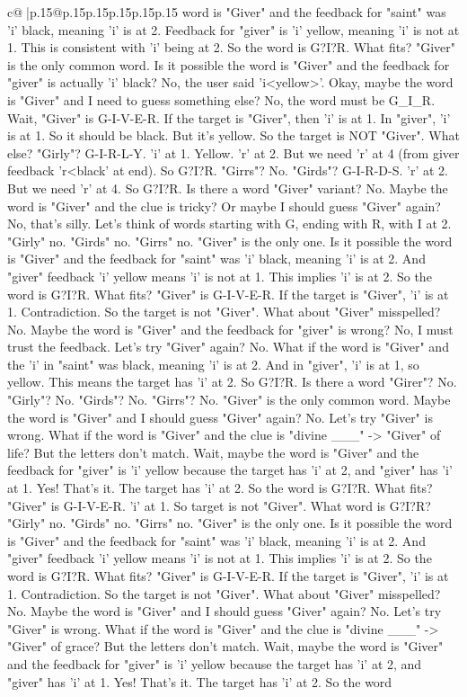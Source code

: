 \documentclass{article}
\begin{document}
{\begin{supertabular}{c@{$\;$}|p{.15\linewidth}@{}p{.15\linewidth}p{.15\linewidth}p{.15\linewidth}p{.15\linewidth}p{.15\linewidth}}
{{{word is "Giver" and the feedback for "saint" was 'i' black, meaning 'i' is at 2. Feedback for "giver" is 'i' yellow, meaning 'i' is not at 1. This is consistent with 'i' being at 2. So the word is G?I?R. What fits? "Giver" is the only common word. Is it possible the word is "Giver" and the feedback for "giver" is actually 'i' black? No, the user said 'i<yellow>'. Okay, maybe the word is "Giver" and I need to guess something else? No, the word must be G\_I\_R. Wait, "Giver" is G{-}I{-}V{-}E{-}R. If the target is "Giver", then 'i' is at 1. In "giver", 'i' is at 1. So it should be black. But it's yellow. So the target is NOT "Giver". What else? "Girly"? G{-}I{-}R{-}L{-}Y. 'i' at 1. Yellow. 'r' at 2. But we need 'r' at 4 (from giver feedback 'r<black' at end). So G?I?R. "Girrs"? No. "Girds"? G{-}I{-}R{-}D{-}S. 'r' at 2. But we need 'r' at 4. So G?I?R. Is there a word "Giver" variant? No. Maybe the word is "Giver" and the clue is tricky? Or maybe I should guess "Giver" again? No, that's silly. Let's think of words starting with G, ending with R, with I at 2. "Girly" no. "Girds" no. "Girrs" no. "Giver" is the only one. Is it possible the word is "Giver" and the feedback for "saint" was 'i' black, meaning 'i' is at 2. And "giver" feedback 'i' yellow means 'i' is not at 1. This implies 'i' is at 2. So the word is G?I?R. What fits? "Giver" is G{-}I{-}V{-}E{-}R. If the target is "Giver", 'i' is at 1. Contradiction. So the target is not "Giver". What about "Giver" misspelled? No. Maybe the word is "Giver" and the feedback for "giver" is wrong? No, I must trust the feedback. Let's try "Giver" again? No. What if the word is "Giver" and the 'i' in "saint" was black, meaning 'i' is at 2. And in "giver", 'i' is at 1, so yellow. This means the target has 'i' at 2. So G?I?R. Is there a word "Girer"? No. "Girly"? No. "Girds"? No. "Girrs"? No. "Giver" is the only common word. Maybe the word is "Giver" and I should guess "Giver" again? No. Let's try "Giver" is wrong. What if the word is "Giver" and the clue is "divine \_\_\_" {-}> "Giver" of life? But the letters don't match. Wait, maybe the word is "Giver" and the feedback for "giver" is 'i' yellow because the target has 'i' at 2, and "giver" has 'i' at 1. Yes! That's it. The target has 'i' at 2. So the word is G?I?R. What fits? "Giver" is G{-}I{-}V{-}E{-}R. 'i' at 1. So target is not "Giver". What word is G?I?R? "Girly" no. "Girds" no. "Girrs" no. "Giver" is the only one. Is it possible the word is "Giver" and the feedback for "saint" was 'i' black, meaning 'i' is at 2. And "giver" feedback 'i' yellow means 'i' is not at 1. This implies 'i' is at 2. So the word is G?I?R. What fits? "Giver" is G{-}I{-}V{-}E{-}R. If the target is "Giver", 'i' is at 1. Contradiction. So the target is not "Giver". What about "Giver" misspelled? No. Maybe the word is "Giver" and I should guess "Giver" again? No. Let's try "Giver" is wrong. What if the word is "Giver" and the clue is "divine \_\_\_" {-}> "Giver" of grace? But the letters don't match. Wait, maybe the word is "Giver" and the feedback for "giver" is 'i' yellow because the target has 'i' at 2, and "giver" has 'i' at 1. Yes! That's it. The target has 'i' at 2. So the word }}}
\end{supertabular}}
\end{document}
